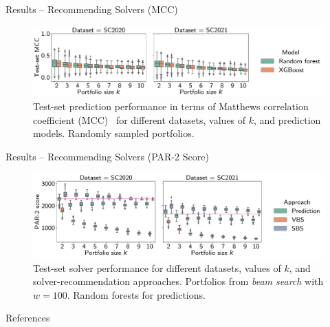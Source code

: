 \documentclass[en]{sdqbeamer}
\begin{document}
\begin{frame}[t]{Results -- Recommending Solvers (MCC)}
	\begin{figure}[htb]
		\centering
		\includegraphics[width=\textwidth]{plots/prediction-test-mcc.pdf}
		\caption*{Test-set prediction performance in terms of Matthews correlation coefficient (MCC)~\cite{matthews1975comparison,gorodkin2004comparing} for different datasets, values of $k$, and prediction models. Randomly sampled portfolios.}
	\end{figure}
\end{frame}

\begin{frame}[t]{Results -- Recommending Solvers (PAR-2 Score)}
	\begin{figure}[htb]
		\centering
		\includegraphics[width=\textwidth]{plots/prediction-test-objective-beam.pdf}
		\caption*{Test-set solver performance for different datasets, values of $k$, and solver-recommendation approaches. Portfolios from \emph{beam search} with $w=100$. Random forests for predictions.}
	\end{figure}
\end{frame}

\appendix
\beginbackup %

\begin{frame}[t, allowframebreaks]{References}
	\printbibliography
\end{frame}

\backupend
\end{document}
